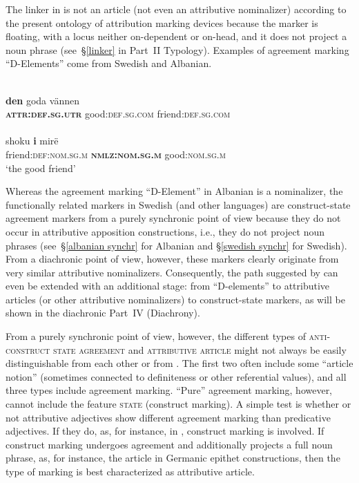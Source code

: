 The linker in  is not an article (not even an attributive nominalizer) according to the present ontology of attribution marking devices because the marker is floating, with a locus neither on-dependent or on-head, and it does not project a noun phrase (see~\S\ref{linker} in Part~II Typology). Examples of agreement marking “D-Elements” come from Swedish and Albanian.
\begin{exe}
\ex
\begin{xlist}
\ex 
{}\\
\gll	\textbf{den} goda vännen\\
	\textbf{\textsc{attr:def.sg.utr}} good:\textsc{def.sg.com} friend:\textsc{def.sg.com}\\
\ex 
{}\\
\gll	shoku \textbf{i} mirë\\
	friend:\textsc{def:nom.sg.m} \textbf{\textsc{nmlz:nom.sg.m}} good:\textsc{nom.sg.m}\\
\glt	‘the good friend’
\end{xlist}
\end{exe}
Whereas the agreement marking “D-Element” in Albanian is a nominalizer, the functionally related markers in Swedish (and other languages) are construct-state agreement markers from a purely synchronic point of view because they do not occur in attributive apposition constructions, i.e., they do not project noun phrases (see~\S\ref{albanian synchr} for Albanian and \S\ref{swedish synchr} for Swedish). From a diachronic point of view, however, these markers clearly originate from very similar attributive nominalizers. Consequently, the  path suggested by \citet{himmelmann1997} can even be extended with an additional stage: from “D-elements” to attributive articles (or other attributive nominalizers) to construct-state markers, as will be shown in the diachronic Part~IV (Diachrony).

From a purely synchronic point of view, however, the different types of \textsc{anti\hyp{}construct state agreement} and \textsc{attributive article} might not always be easily distinguishable from each other or from \textsc{}. The first two often include some “article notion” (sometimes connected to definiteness or other referential values), and all three types include agreement marking. “Pure” agreement marking, however, cannot include the feature \textsc{state} (construct marking). A simple test is whether or not attributive adjectives show different agreement marking than predicative adjectives. If they do, as, for instance, in , construct marking is involved. If construct marking undergoes agreement and additionally projects a full noun phrase, as, for instance, the article in Germanic epithet constructions, then the type of marking is best characterized as attributive article.

